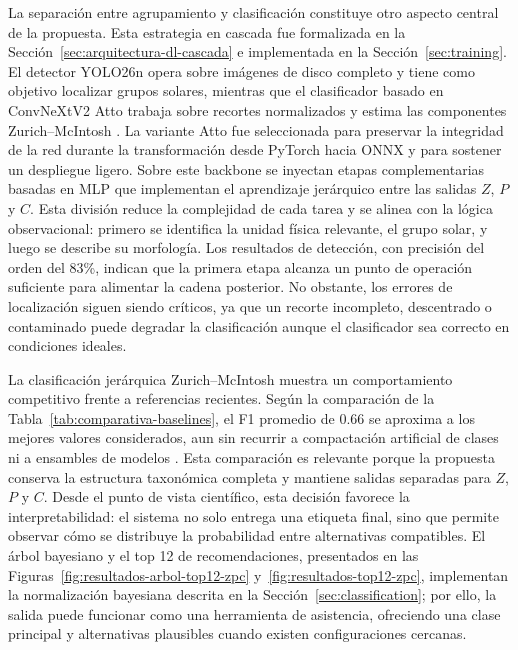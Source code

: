 La separación entre agrupamiento y clasificación constituye otro aspecto central
de la propuesta. Esta estrategia en cascada fue formalizada en la
Sección~\ref{sec:arquitectura-dl-cascada} e implementada en la
Sección~\ref{sec:training}. El detector YOLO26n opera sobre imágenes de disco
completo y tiene como objetivo localizar grupos solares, mientras que el
clasificador basado en ConvNeXtV2 Atto trabaja sobre recortes normalizados y
estima las componentes Zurich--McIntosh \citep{ultralyticsYOLO26,woo2023convnextv2}.
La variante Atto fue seleccionada para preservar la integridad de la red durante
la transformación desde PyTorch hacia ONNX y para sostener un despliegue ligero.
Sobre este backbone se inyectan etapas complementarias basadas en MLP que
implementan el aprendizaje jerárquico entre las salidas $Z$, $P$ y $C$.
Esta división reduce la complejidad de cada tarea y se alinea
con la lógica observacional: primero se identifica la unidad física relevante,
el grupo solar, y luego se describe su morfología. Los resultados de detección,
con precisión del orden del 83\%, indican que la primera etapa alcanza un punto
de operación suficiente para alimentar la cadena posterior. No obstante, los
errores de localización siguen siendo críticos, ya que un recorte incompleto,
descentrado o contaminado puede degradar la clasificación aunque el clasificador
sea correcto en condiciones ideales.

La clasificación jerárquica Zurich--McIntosh muestra un comportamiento
competitivo frente a referencias recientes. Según la comparación de la
Tabla~\ref{tab:comparativa-baselines}, el F1 promedio de 0.66 se aproxima a los
mejores valores considerados, aun sin recurrir a compactación artificial de
clases ni a ensambles de modelos
\citep{palladino2022sunspot,sayez2023sunscc,deng2025mcintosh}. Esta
comparación es relevante porque la
propuesta conserva la estructura taxonómica completa y mantiene salidas
separadas para $Z$, $P$ y $C$. Desde el punto de vista científico, esta decisión
favorece la interpretabilidad: el sistema no solo entrega una etiqueta final,
sino que permite observar cómo se distribuye la probabilidad entre alternativas
compatibles. El árbol bayesiano y el top 12 de recomendaciones, presentados en
las Figuras~\ref{fig:resultados-arbol-top12-zpc} y~\ref{fig:resultados-top12-zpc},
implementan la normalización bayesiana descrita en la
Sección~\ref{sec:classification}; por ello, la salida puede funcionar como una
herramienta de asistencia, ofreciendo una clase principal y alternativas
plausibles cuando existen configuraciones cercanas.

